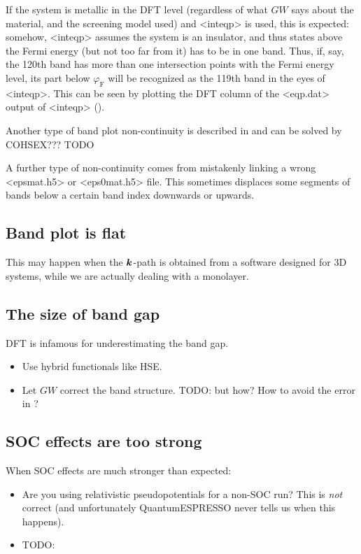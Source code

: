 \documentclass[hyperref, a4paper, 12pt]{report}
\def\texttt#1{<#1>}%
\newcommand{\shortcode}[1]{\texttt{#1}}
\begin{document}
If the system is metallic in the DFT level 
(regardless of what $GW$ says about the material, 
and the screening model used)
and \shortcode{inteqp} is used, 
this is expected:
somehow, \shortcode{inteqp} assumes the system is an insulator,
and thus states above the Fermi energy (but not too far from it)
has to be in one band.
Thus, if, say, the 120th band has more than one intersection points 
with the Fermi energy level,
its part below $\varphi_{\text{F}}$ will be recognized as the 119th band
in the eyes of \shortcode{inteqp}.
This can be seen by plotting the DFT column of the \shortcode{eqp.dat} output of \shortcode{inteqp}
().

Another type of band plot non-continuity is described in \cite{berger2020potential} 
and can be solved by COHSEX??? TODO

A further type of non-continuity comes from mistakenly linking a wrong \shortcode{epsmat.h5} 
or \shortcode{eps0mat.h5} file.
This sometimes displaces some segments of bands below a certain band index downwards or upwards.

\subsection{Band plot is flat}

This may happen when the $\vb*{k}$-path is obtained 
from a software designed for 3D systems, 
while we are actually dealing with a monolayer.

\subsection{The size of band gap}\label{sec:band-gap-problem}

DFT is infamous for underestimating the band gap.

\begin{itemize}
    \item Use hybrid functionals like HSE.
    \item Let $GW$ correct the band structure. TODO: but how? How to avoid the error in ?
\end{itemize}

\subsection{SOC effects are too strong}

When SOC effects are much stronger than expected: 
\begin{itemize}
    \item Are you using relativistic pseudopotentials for a non-SOC run?
        This is \emph{not} correct 
        (and unfortunately QuantumESPRESSO never tells us when this happens).
    \item TODO: 
\end{itemize}
\end{document}
